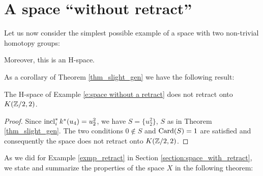 \section{A space ``without retract''}\label{section:azerty}

Let us now consider the simplest possible example of a space with two non-trivial homotopy groups:

\begin{exmp_no_retract}

 Moreover, this is an H-space.
\end{exmp_no_retract}

As a corollary of Theorem \ref{thm_slight_gen} we have the following result:

\begin{cor}
The H-space of Example \ref{e:space without a retract} does not retract onto $K(\mathbb{Z}/2,2)$.
\end{cor}

\begin{proof}
Since $\operatorname{incl}_i^*k^*(u_4)=u_2^2$, we have $S=\{u_2^2\}$, $S$ as in Theorem \ref{thm_slight_gen}. The two conditions $0\not\in S$ and $\operatorname{Card}(S)=1$ are satisfied and consequently the space does not retract onto $K(\mathbb{Z}/2,2)$.
\end{proof}

As we did for Example \ref{exmp_retract} in Section \ref{section:space_with_retract}, we state and summarize the properties of the space $X$ in the following theorem:

\begin{thm_no_retract}

\end{thm_no_retract}

